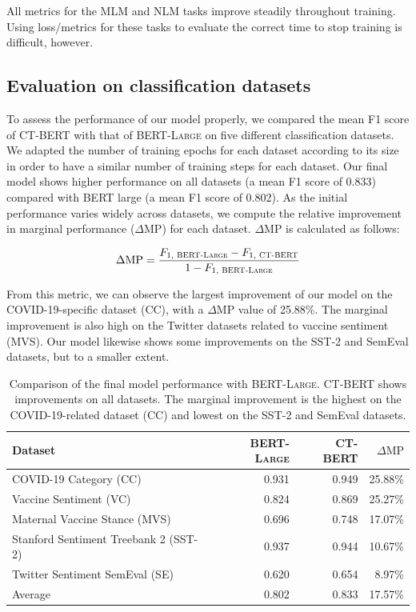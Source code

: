 \documentclass{article}
\begin{document}
All metrics for the MLM and NLM tasks improve steadily throughout training.
Using loss/metrics for these tasks to evaluate the correct time to stop training is difficult, however.

\subsection{Evaluation on classification datasets}
\label{sec:evaluation_classification}

To assess the performance of our model properly, we compared the mean F1 score of \textsc{CT-BERT} with that of \textsc{BERT-Large} on five different classification datasets.
We adapted the number of training epochs for each dataset according to its size in order to have a similar number of training steps for each dataset.
Our final model shows higher performance on all datasets (a mean F1 score of \num{0.833}) compared with BERT large (a mean F1 score of \num{0.802}).
As the initial performance varies widely across datasets, we compute the relative improvement in marginal performance ($\Delta$MP) for each dataset.
$\Delta$MP is calculated as follows:

$$ \Delta\text{MP} = \frac{F_{1, \text{ \textsc{BERT-Large}}} - F_{1, \text{ \textsc{CT-BERT}}}}{1- F_{1, \text{ \textsc{BERT-Large}}}} $$

From this metric, we can observe the largest improvement of our model on the COVID-19-specific dataset (CC), with a $\Delta$MP value of 25.88\%.
The marginal improvement is also high on the Twitter datasets related to vaccine sentiment (MVS).
Our model likewise shows some improvements on the SST-2 and SemEval datasets, but to a smaller extent.

\begin{table}[h!]
  \centering
  \caption{
    Comparison of the final model performance with \textsc{BERT-Large}.
    \textsc{CT-BERT} shows improvements on all datasets.
    The marginal improvement is the highest on the COVID-19-related dataset (CC) and lowest on the SST-2 and SemEval datasets.
  }
  \begin{tabular}{lrrr}
    \toprule
    Dataset  & \textsc{BERT-Large} & \textsc{CT-BERT} & $\Delta\text{MP}$  \\
    \midrule
    COVID-19 Category (CC)                    & 0.931 & 0.949 & 25.88\%  \\
    Vaccine Sentiment (VC)                    & 0.824 & 0.869 & 25.27\%  \\
    Maternal Vaccine Stance (MVS)             & 0.696 & 0.748 & 17.07\%  \\
    Stanford Sentiment Treebank 2 (SST-2)     & 0.937 & 0.944 & 10.67\%  \\
    Twitter Sentiment SemEval (SE)            & 0.620 & 0.654 & 8.97\%   \\
    \midrule
    Average &  0.802 & 0.833 & 17.57\% \\
    \bottomrule
  \end{tabular}
\end{table}
\end{document}

